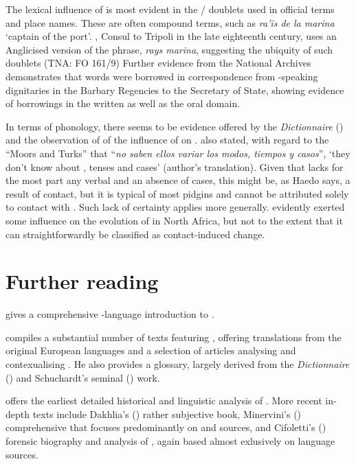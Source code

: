 \documentclass[output=paper]{langsci/langscibook}
\begin{document}
	The lexical influence of  is most evident in the / doublets used in official terms and place names. These are often compound terms, such as \textit{ra’ïs de la marina} ‘captain of the port’. ,  Consul to Tripoli in the late eighteenth century, uses an Anglicised version of the phrase, \textit{rays marina}, suggesting the ubiquity of such doublets (TNA: FO 161/9) Further evidence from the National Archives \citep{Hopkins1982} demonstrates that  words were borrowed in correspondence from -speaking dignitaries in the Barbary Regencies to the  Secretary of State, showing evidence of  borrowings in the written as well as the oral domain. 
	
	In terms of phonology, there seems to be evidence offered by the \textit{Dictionnaire} (\citeyear{Anonymous1830}) and the observation of \citet{Haedo1612} of the influence of  on . \citet[24]{Haedo1612} also stated, with regard to the ``Moors and Turks'' that ``\textit{no saben ellos variar los modos, tiempos y casos}'', ‘they don’t know about , tenses and cases’ (author's translation). Given that  lacks for the most part any verbal  and an absence of cases, this might be, as Haedo says, a result of contact, but it is typical of most pidgins and cannot be attributed solely to contact with . Such lack of certainty applies more generally.  evidently exerted some influence on the evolution of  in North Africa, but not to the extent that it can straightforwardly be classified as contact-induced change.
	
\section*{Further reading}
	
	\citet{Nolan2018} gives a comprehensive -language introduction to .
	
	\citet{Corré2005} compiles a substantial number of texts featuring , offering translations from the original European languages and a selection of articles analysing and contexualising . He also provides a glossary, largely derived from the \textit{Dictionnaire} (\citeyear{Anonymous1830}) and Schuchardt’s seminal (\citeyear{Schuchardt1909}) work.
	
	\citet{Schuchardt1909} offers the earliest detailed historical and linguistic analysis of . More recent in-depth texts include Dakhlia's (\citeyear{Dakhlia2008}) rather subjective book, Minervini's (\citeyear{Minervini1996}) comprehensive  that focuses predominantly on  and  sources, and Cifoletti's (\citeyear{Cifoletti2004}) forensic biography and analysis of , again based almost exlusively on  language sources. 
	
\end{document}
